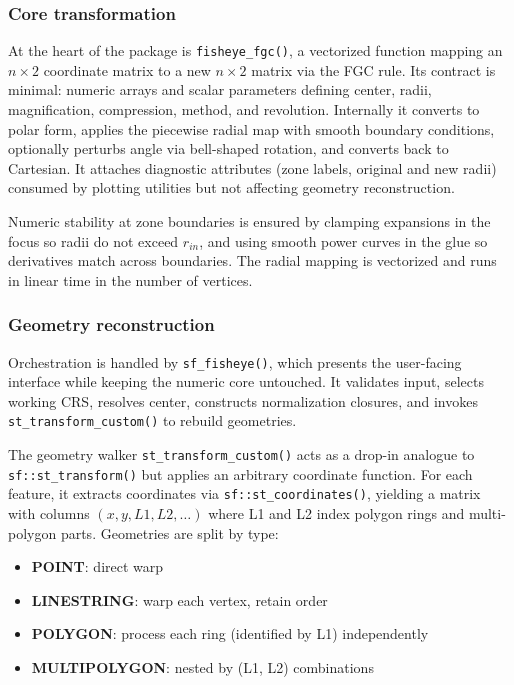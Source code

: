 \hypertarget{core-transformation}{%
\subsubsection{Core transformation}\label{core-transformation}}

At the heart of the package is \texttt{fisheye\_fgc()}, a vectorized function mapping an \(n \times 2\) coordinate matrix to a new \(n \times 2\) matrix via the FGC rule. Its contract is minimal: numeric arrays and scalar parameters defining center, radii, magnification, compression, method, and revolution. Internally it converts to polar form, applies the piecewise radial map with smooth boundary conditions, optionally perturbs angle via bell-shaped rotation, and converts back to Cartesian. It attaches diagnostic attributes (zone labels, original and new radii) consumed by plotting utilities but not affecting geometry reconstruction.

Numeric stability at zone boundaries is ensured by clamping expansions in the focus so radii do not exceed \(r_{in}\), and using smooth power curves in the glue so derivatives match across boundaries. The radial mapping is vectorized and runs in linear time in the number of vertices.

\hypertarget{geometry-reconstruction}{%
\subsubsection{Geometry reconstruction}\label{geometry-reconstruction}}

Orchestration is handled by \texttt{sf\_fisheye()}, which presents the user-facing interface while keeping the numeric core untouched. It validates input, selects working CRS, resolves center, constructs normalization closures, and invokes \texttt{st\_transform\_custom()} to rebuild geometries.

The geometry walker \texttt{st\_transform\_custom()} acts as a drop-in analogue to \texttt{sf::st\_transform()} but applies an arbitrary coordinate function. For each feature, it extracts coordinates via \texttt{sf::st\_coordinates()}, yielding a matrix with columns \((x, y, L1, L2, \dots)\) where L1 and L2 index polygon rings and multi-polygon parts. Geometries are split by type:

\begin{itemize}
\tightlist
\item
  \textbf{POINT}: direct warp
\item
  \textbf{LINESTRING}: warp each vertex, retain order\\
\item
  \textbf{POLYGON}: process each ring (identified by L1) independently
\item
  \textbf{MULTIPOLYGON}: nested by (L1, L2) combinations
\end{itemize}

